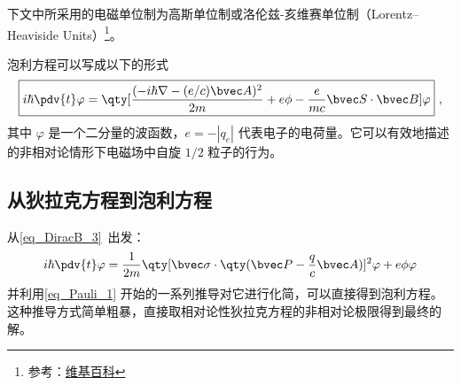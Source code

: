 

下文中所采用的电磁单位制为高斯单位制或洛伦兹-亥维赛单位制（Lorentz–Heaviside Units）\footnote{参考：\href{https://en.wikipedia.org/wiki/Lorentz–Heaviside_units}{维基百科}}。

泡利方程可以写成以下的形式
\begin{equation}
\boxed{
i\hbar\pdv{t} \varphi = \qty[\frac{(-i\hbar\nabla - (e/c)\bvec A)^2}{2m}+e\phi-\frac{e}{mc}\bvec S\cdot \bvec B]\varphi}~,
\end{equation}
其中 $\varphi$ 是一个二分量的波函数，$e=-|q_e|$ 代表电子的电荷量。它可以有效地描述的非相对论情形下电磁场中自旋 $1/2$ 粒子的行为。
\subsection{从狄拉克方程到泡利方程}
从\autoref{eq_DiracB_3}~出发：
\begin{equation}
i\hbar\pdv{t} \varphi = \frac{1}{2m}\qty[\bvec \sigma \cdot\qty(\bvec P - \frac{q}{c}\bvec A)]^2 \varphi + e\phi  \varphi
\end{equation}
并利用\autoref{eq_Pauli_1} 开始的一系列推导对它进行化简，可以直接得到泡利方程。这种推导方式简单粗暴，直接取相对论性狄拉克方程的非相对论极限得到最终的解。
